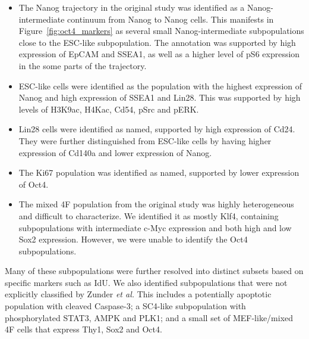 \documentclass{article}
\begin{document}
\begin{itemize}
    \item The Nanog\hi{} trajectory in the original study was identified as a Nanog-intermediate continuum from Nanog\lo{} to Nanog\hi{} cells.
        This manifests in Figure~\ref{fig:oct4_markers} as several small Nanog-intermediate subpopulations close to the ESC-like subpopulation.
        The annotation was supported by high expression of EpCAM and SSEA1, as well as a higher level of pS6 expression in the some parts of the trajectory.
    \item ESC-like cells were identified as the population with the highest expression of Nanog and high expression of SSEA1 and Lin28.
        This was supported by high levels of H3K9ac, H4Kac, Cd54, pSrc and pERK.
    \item Lin28\hi{} cells were identified as named, supported by high expression of Cd24.
They were further distinguished from ESC-like cells by having higher expression of Cd140a and lower expression of Nanog.
    \item The Ki67\hi{} population was identified as named, supported by lower expression of Oct4.
    \item The mixed 4F population from the original study was highly heterogeneous and difficult to characterize.
We identified it as mostly Klf4\lo{}, containing subpopulations with intermediate c-Myc expression and both high and low Sox2 expression.
However, we were unable to identify the Oct4\lo{} subpopulations.
\end{itemize}
Many of these subpopulations were further resolved into distinct subsets based on specific markers such as IdU.
We also identified subpopulations that were not explicitly classified by Zunder \emph{et al.}
This includes a potentially apoptotic population with cleaved Caspase-3;
    a SC4-like subpopulation with phosphorylated STAT3, AMPK and PLK1;
    and a small set of MEF-like/mixed 4F cells that express Thy1, Sox2 and Oct4.


\newpage
\end{document}
